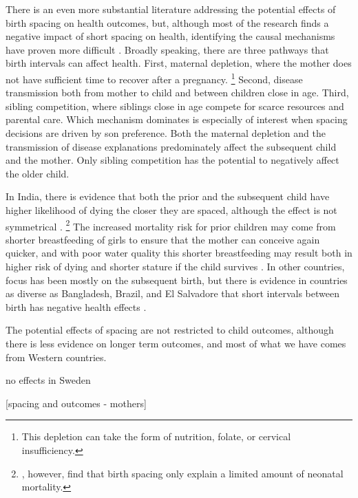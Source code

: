 There is an even more substantial literature addressing the potential effects of birth 
spacing on health outcomes, but, although most of the research finds a negative impact of 
short spacing on health, identifying the causal mechanisms have proven more difficult
\citep{Conde-Agudelo2006,Conde-Agudelo2012}.
Broadly speaking, there are three pathways that birth intervals can affect health.
First, maternal depletion, where the mother does not have sufficient
time to recover after a pregnancy.%
\footnote{
This depletion can take the form of nutrition, folate, or cervical insufficiency.
}
Second, disease transmission both from mother to child and between children close in age.
Third, sibling competition, where siblings close in age compete for scarce resources and
parental care.
Which mechanism dominates is especially of interest when spacing decisions are driven by 
son preference.
Both the maternal depletion and the transmission of disease explanations predominately
affect the subsequent child and the mother.
Only sibling competition has the potential to negatively affect the older child.

In India, there is evidence that both the prior and the subsequent child have higher
likelihood of dying the closer they are spaced, although the effect is not symmetrical
\citep{Whitworth2002,Bhargava2003,Maitra2008,Makepeace2008}.%
\footnote{
\cite{Bhalotra2008}, however, find that birth spacing only explain a limited amount
of neonatal mortality.
}
The increased mortality risk for prior children may come from shorter breastfeeding of 
girls to ensure that the mother can conceive again quicker, and with poor water
quality this shorter breastfeeding may result both in higher risk of dying and shorter
stature if the child survives \citep{Jayachandran2011,Jayachandran2017a}.
In other countries, focus has been mostly on the subsequent birth, but there is evidence 
in countries as diverse as Bangladesh, Brazil, and El Salvadore that
short intervals between birth has negative health effects
\citep{Curtis1993,Davanzo2008,Gribble2009,Saha2013}.

The potential effects of spacing are not restricted to child outcomes, although
there is less evidence on longer term outcomes, and most of what we have comes from
Western countries.


\citep{Buckles2012}

\citep{Barclay2017} no effects in Sweden

[spacing and outcomes - mothers]



